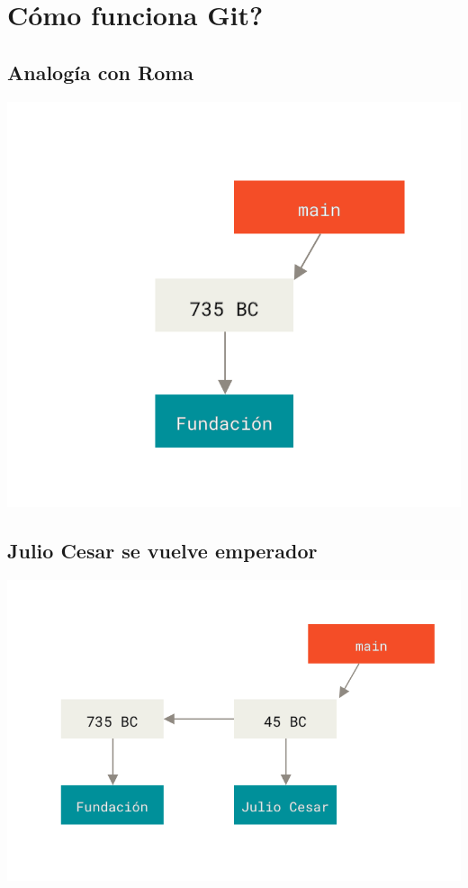 \section{Cómo funciona Git?}

\subsection{Analogía con Roma}

\includegraphics{figs/stage1.png}

\subsection{Julio Cesar se vuelve emperador}

\includegraphics{figs/stage2.png}

